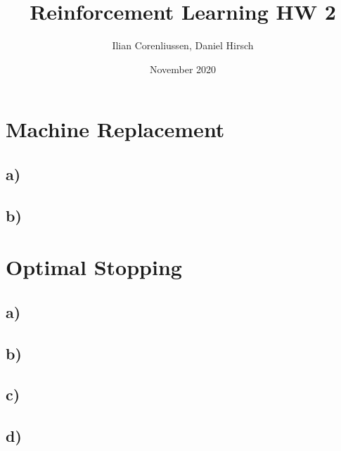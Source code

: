 \documentclass{article}
\title{Reinforcement Learning HW 2}
\author{Ilian Corenliussen, Daniel Hirsch}
\date{November 2020}
\begin{document}
\maketitle

\section{Machine Replacement}
\subsection*{a)}
\subsection*{b)}


\section{Optimal Stopping}
\subsection*{a)}
\subsection*{b)}
\subsection*{c)}
\subsection*{d)}
\end{document}

